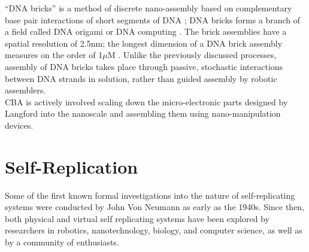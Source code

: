 {``DNA bricks'' is a method of discrete nano-assembly based on complementary base pair interactions of short segments of DNA \cite{Ke2012}; DNA bricks forms a branch of a field called DNA origami \cite{Rothemund2006} or DNA computing \cite{Seeman1982} \cite{Adleman1994}.  The brick assemblies have a spatial resolution of 2.5nm; the longest dimension of a DNA brick assembly measures on the order of 1$\mu$M \cite{Ke2014}.  Unlike the previously discussed processes, assembly of DNA bricks takes place through passive, stochastic interactions between DNA strands in solution, rather than guided assembly by robotic assemblers.
\\

CBA is actively involved scaling down the micro-electronic parts designed by Langford \cite{Langford2014} into the nanoscale and assembling them using nano-manipulation devices.

\section{Self-Replication}

Some of the first known formal investigations into the nature of self-replicating systems were conducted by John Von Neumann as early as the 1940s.  Since then, both physical and virtual self replicating systems have been explored by researchers in robotics, nanotechnology, biology, and computer science, as well as by a community of enthusiasts.\\

%
%


}
